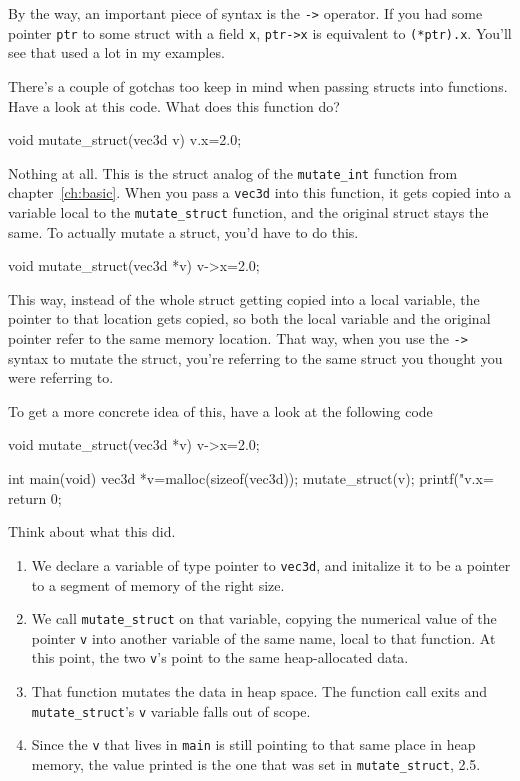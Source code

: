 \documentclass[ebook,11pt,oneside,openany]{memoir}
\newcommand{\cf}[1]{\texttt{#1}}
\begin{document}
By the way, an important piece of syntax is the \cf{->} operator. If you had some pointer \cf{ptr} to some struct with a field \cf{x}, \cf{ptr->x} is equivalent to \cf{(*ptr).x}. You'll see that used a lot in my examples.

There's a couple of gotchas too keep in mind when passing structs into functions. Have a look at this code. What does this function do?

\begin{code}[language=C]
void mutate_struct(vec3d v)
{
  v.x=2.0;
}
\end{code}

Nothing at all. This is the struct analog of the \cf{mutate\_int} function from chapter~\ref{ch:basic}. When you pass a \cf{vec3d} into this function, it gets copied into a variable local to the \cf{mutate\_struct} function, and the original struct stays the same. To actually mutate a struct, you'd have to do this.

\begin{code}[language=C]
void mutate_struct(vec3d *v) 
{
  v->x=2.0;
}
\end{code}

This way, instead of the whole struct getting copied into a local variable, the pointer to that location gets copied, so both the local variable and the original pointer refer to the same memory location. That way, when you use the \cf{->} syntax to mutate the struct, you're referring to the same struct you thought you were referring to. 

To get a more concrete idea of this, have a look at the following code
\pagebreak
\begin{code}[language=C]
void mutate_struct(vec3d *v)
{
  v->x=2.0;
}

int main(void)
{
  vec3d *v=malloc(sizeof(vec3d));
  mutate_struct(v);
  printf("v.x=%
  return 0;
}
\end{code}

\noindent
Think about what this did. 
\begin{enumerate}
\item We declare a variable of type pointer to \cf{vec3d}, and initalize it to be a pointer to a segment of memory of the right size. 

\item We call \cf{mutate\_struct} on that variable, copying the numerical value of the pointer \cf{v} into another variable of the same name, local to that function. At this point, the two \cf{v}'s point to the same heap-allocated data.

\item That function mutates the data in heap space. The function call exits and \cf{mutate\_struct}'s \cf{v} variable falls out of scope. 

\item Since the \cf{v} that lives in \cf{main} is still pointing to that same place in heap memory, the value printed is the one that was set in \cf{mutate\_struct}, 2.5.

\end{enumerate}
\end{document}
